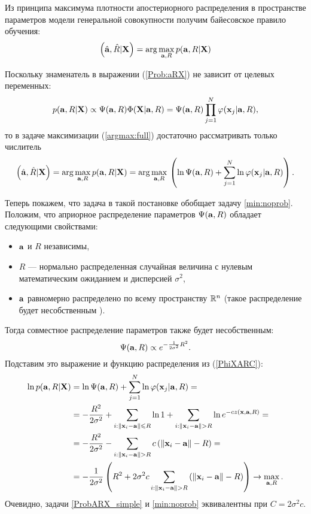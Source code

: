 Из принципа максимума плотности апостериорного распределения в пространстве параметров модели генеральной совокупности получим байесовское правило обучения:
\begin{equation}
	\label{argmax:full}
	\left(\hat{\mathbf{a}},\hat R|\mathbf{X}\right) = \arg\underset{\mathbf{a},R}\max\, p(\mathbf{a},R|\mathbf{X})
\end{equation}

Поскольку знаменатель в выражении (\ref{Prob:aRX}) не зависит от целевых переменных: 
$$p(\mathbf{a},R|\mathbf{X}) 
	\propto \Psi(\mathbf{a},R) \Phi(\mathbf{X}|\mathbf{a},R) 
	=  \Psi(\mathbf{a},R) \prod_{j=1}^N \varphi(\mathbf{x}_j|\mathbf{a},R),$$
то в задаче максимизации (\ref{argmax:full}) достаточно рассматривать только числитель
$$\left(\hat{\mathbf{a}},\hat R|\mathbf{X}\right)
	= \arg\underset{\mathbf{a},R}\max\, p(\mathbf{a},R|\mathbf{X}) 
	= \arg\underset{\mathbf{a},R}\max\, \left(\ln\Psi(\mathbf{a},R) + \sum_{j=1}^N\ln\varphi(\mathbf{x}_j|\mathbf{a},R)\right). $$

Теперь покажем, что задача в такой постановке обобщает задачу \ref{min:noprob}. 
Положим, что априорное распределение параметров $\Psi(\mathbf{a},R)$ обладает следующими свойствами:
\begin{itemize}
 	\item $\mathbf{a}$ и $R$ независимы,
 	\item $R$ --- нормально распределенная случайная величина с нулевым математическим ожиданием и дисперсией $\sigma^2$,
 	\item $\mathbf{a}$ равномерно распределено по всему пространству $\mathbb{R}^n$ (такое распределение будет несобственным \cite{Groot}).
 \end{itemize} 
 Тогда совместное распределение параметров также будет несобственным: 
 $$\Psi(\mathbf{a},R)\propto e^{-\frac1{2\sigma^2}R^2}.$$
 Подставим это выражение и функцию распределения из (\ref{PhiXARC}):
 \begin{align}
 	\label{ProbARX_simple}
 	\ln p(\mathbf{a},R|\mathbf{X}) 
 		&=	\ln\Psi(\mathbf{a},R) + \sum_{j=1}^N\ln\varphi(\mathbf{x}_j|\mathbf{a},R) =\notag \\
 		&= 	-\frac{R^2}{2\sigma^2} + \sum_{i: \left\|{\mathbf{x}_i - \mathbf{a}}\right\| \leqslant R} \ln 1 
 			+ \sum_{i: \left\|{\mathbf{x}_i - \mathbf{a}}\right\| > R} \ln e^{-c z(\mathbf{x},\mathbf{a},R)}  = \notag \\
 		&= -\frac{R^2}{2\sigma^2} - \sum_{i: \left\|{\mathbf{x}_i - \mathbf{a}}\right\| > R} c\left(\left\|{\mathbf{x}_i - \mathbf{a}}\right\| -R\right) = \notag \\
 		&= -\frac1{2\sigma^2}\left(R^2 + 2\sigma^2 c\sum_{i: \left\|{\mathbf{x}_i - \mathbf{a}}\right\| > R} \left(\left\|{\mathbf{x}_i - \mathbf{a}}\right\| -R\right)\right) \to \max_{\mathbf{a}, R}.
 \end{align}
 Очевидно, задачи \ref{ProbARX_simple} и \ref{min:noprob} эквивалентны при $C = 2\sigma^2 c.$

 